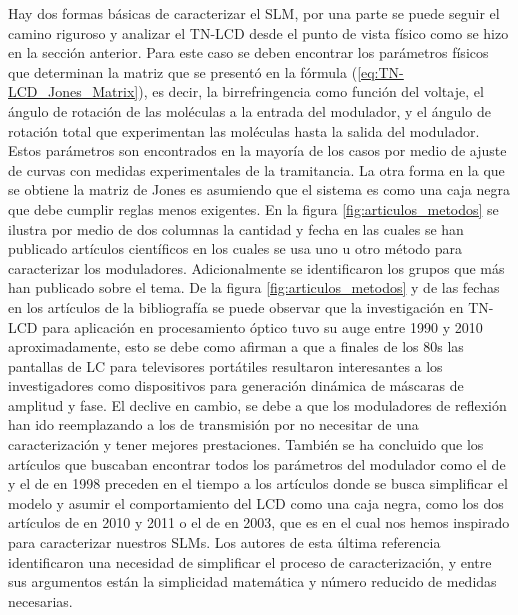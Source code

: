 Hay dos formas básicas de caracterizar el
SLM, por una parte se puede seguir el camino riguroso y analizar el
TN-LCD desde el punto de vista físico como se hizo en la sección
anterior. Para este caso se deben encontrar los parámetros físicos que
determinan la matriz que se presentó en la fórmula
(\ref{eq:TN-LCD_Jones_Matrix}), es decir, la 
birrefringencia como función del voltaje, el ángulo de rotación de las
moléculas a la entrada del modulador, y el ángulo de rotación total
que experimentan las moléculas hasta la salida del modulador. Estos
parámetros son encontrados en la mayoría de los casos por medio de
ajuste de curvas con medidas experimentales de la tramitancia.  La
otra forma en la que se obtiene la matriz de Jones es asumiendo que el
sistema es como una caja negra que debe cumplir reglas menos
exigentes. En la figura \ref{fig:articulos_metodos} se ilustra por
medio de dos columnas la cantidad y fecha en las cuales se han
publicado artículos científicos en los cuales se usa uno u otro método
para caracterizar los moduladores. Adicionalmente se identificaron los
grupos que más han publicado sobre el tema. De la figura
\ref{fig:articulos_metodos} y de las fechas en los artículos de la
bibliografía se puede observar que la investigación en TN-LCD para
aplicación en procesamiento óptico tuvo su auge entre 1990 y 2010
aproximadamente, esto se debe como afirman 
a que a finales de los 80s las pantallas 
de LC para televisores portátiles resultaron interesantes a los
investigadores como dispositivos para generación dinámica de máscaras
de amplitud y fase. El declive en cambio, se debe a que los
moduladores de reflexión han ido reemplazando a los de transmisión por
 no necesitar de una caracterización y tener mejores prestaciones. 
También se ha concluido que los artículos que buscaban encontrar todos los
parámetros del modulador como el de  y
el de  en 1998 preceden en el tiempo a los artículos
donde se busca simplificar el modelo y asumir el comportamiento del
LCD como una caja negra, como los dos artículos de  en 2010 y
2011 o el de  en 2003, que es en el cual nos
hemos inspirado para caracterizar nuestros SLMs. Los autores de esta
última referencia identificaron una necesidad de 
simplificar el proceso de caracterización, y entre sus argumentos 
están la simplicidad matemática y número reducido de medidas necesarias.
